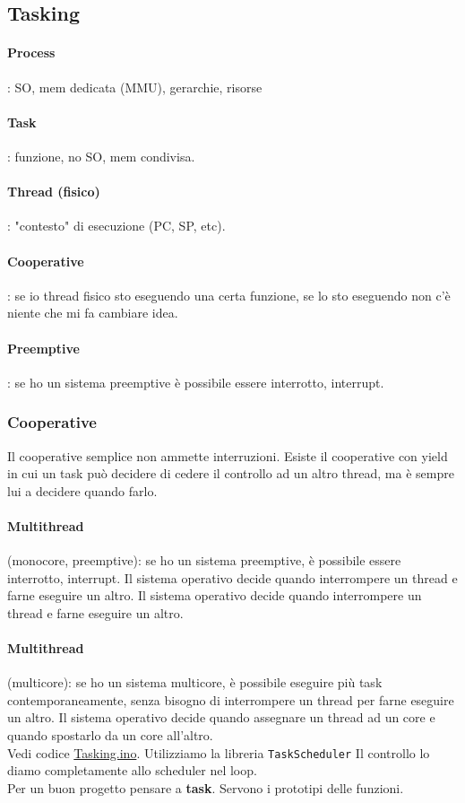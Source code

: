 \documentclass{article}
\begin{document}
\subsection{Tasking}
\paragraph{Process} \mbox{}: SO, mem dedicata (MMU), gerarchie, risorse
\paragraph{Task} \mbox{}: funzione, no SO, mem condivisa.
\paragraph{Thread (fisico)} \mbox{}: "contesto" di esecuzione (PC, SP, etc).
\paragraph{Cooperative} \mbox{}: se io thread fisico sto eseguendo una certa funzione, se lo sto eseguendo non c'è niente che mi fa cambiare idea.
\paragraph{Preemptive} \mbox{}: se ho un sistema preemptive è possibile essere interrotto, interrupt.
\subsubsection{Cooperative}
Il cooperative semplice non ammette interruzioni. Esiste il cooperative con yield in cui un task può decidere di cedere il controllo ad un altro thread, ma è sempre lui a decidere quando farlo.
\paragraph{Multithread} \mbox{} (monocore, preemptive): se ho un sistema preemptive, è possibile essere interrotto, interrupt. Il sistema operativo decide quando interrompere un thread e farne eseguire un altro. Il sistema operativo decide quando interrompere un thread e farne eseguire un altro.
\paragraph{Multithread} \mbox{} (multicore): se ho un sistema multicore, è possibile eseguire più task contemporaneamente, senza bisogno di interrompere un thread per farne eseguire un altro. Il sistema operativo decide quando assegnare un thread ad un core e quando spostarlo da un core all'altro.
\\ Vedi codice \href{run:../codice/Tasking/Tasking.ino}{Tasking.ino}. Utilizziamo la libreria \texttt{TaskScheduler}
Il controllo lo diamo completamente allo scheduler nel loop.
\\ Per un buon progetto pensare a \textbf{task}. Servono i prototipi delle funzioni.
\end{document}
